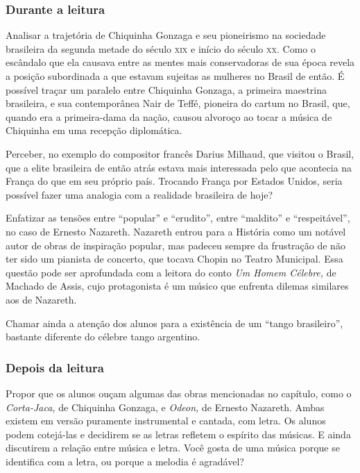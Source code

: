 \documentclass[11pt]{extarticle}
\begin{document}
\subsubsection{Durante a leitura}

Analisar a trajetória de Chiquinha Gonzaga e seu pioneirismo na
sociedade brasileira da segunda metade do século \textsc{xix} e início do século
\textsc{xx}. Como o escândalo que ela causava entre as mentes mais conservadoras
de sua época revela a posição subordinada a que estavam sujeitas as
mulheres no Brasil de então. É possível traçar um paralelo entre
Chiquinha Gonzaga, a primeira maestrina brasileira, e sua contemporânea
Nair de Teffé, pioneira do cartum no Brasil, que, quando era a
primeira-dama da nação, causou alvoroço ao tocar a música de Chiquinha
em uma recepção diplomática.


Perceber, no exemplo do compositor francês Darius Milhaud, que visitou o
Brasil, que a elite brasileira de então atrás estava mais interessada
pelo que acontecia na França do que em seu próprio país. Trocando França
por Estados Unidos, seria possível fazer uma analogia com a realidade
brasileira de hoje?

Enfatizar as tensões entre ``popular'' e ``erudito'', entre ``maldito''
e ``respeitável'', no caso de Ernesto Nazareth. Nazareth entrou para a
História como um notável autor de obras de inspiração popular, mas
padeceu sempre da frustração de não ter sido um pianista de concerto,
que tocava Chopin no Teatro Municipal. Essa questão pode ser aprofundada
com a leitora do conto \emph{Um Homem Célebre,} de Machado de Assis,
cujo protagonista é um músico que enfrenta dilemas similares aos de
Nazareth.

Chamar ainda a atenção dos alunos para a existência de um ``tango
brasileiro'', bastante diferente do célebre tango argentino.

\subsubsection{Depois da leitura}

Propor que os alunos ouçam algumas das obras mencionadas no capítulo,
como o \emph{Corta-Jaca,} de Chiquinha Gonzaga, e \emph{Odeon,} de
Ernesto Nazareth. Ambas existem em versão puramente instrumental e
cantada, com letra. Os alunos podem cotejá-las e decidirem se as letras
refletem o espírito das músicas. E ainda discutirem a relação entre
música e letra. Você gosta de uma música porque se identifica com a
letra, ou porque a melodia é agradável?
\end{document}
